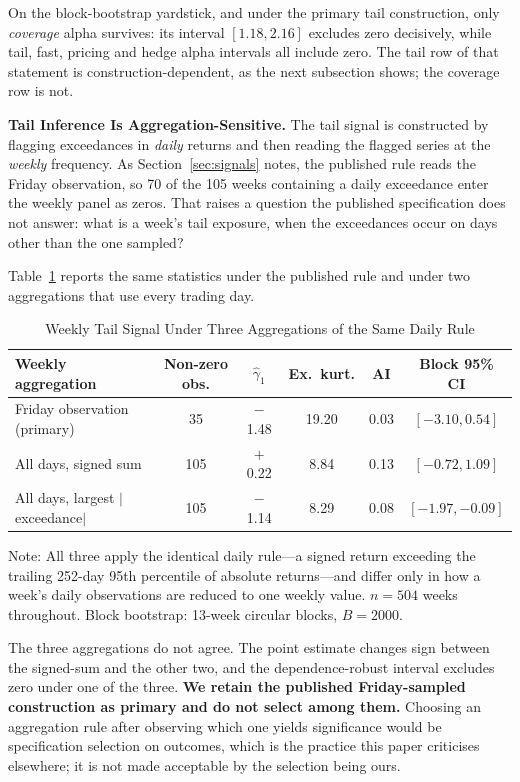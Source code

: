 \documentclass[11pt]{article}
\begin{document}
On the block-bootstrap yardstick, and under the primary tail construction, only \emph{coverage} alpha survives: its interval $[1.18, 2.16]$ excludes zero decisively, while tail, fast, pricing and hedge alpha intervals all include zero. The tail row of that statement is construction-dependent, as the next subsection shows; the coverage row is not.

\textbf{Tail Inference Is Aggregation-Sensitive.} The tail signal is constructed by flagging exceedances in \emph{daily} returns and then reading the flagged series at the \emph{weekly} frequency. As Section~\ref{sec:signals} notes, the published rule reads the Friday observation, so 70 of the 105 weeks containing a daily exceedance enter the weekly panel as zeros. That raises a question the published specification does not answer: what is a week's tail exposure, when the exceedances occur on days other than the one sampled?

Table~\ref{tab:tailagg} reports the same statistics under the published rule and under two aggregations that use every trading day.

\begin{table}[H]
\centering
\caption{Weekly Tail Signal Under Three Aggregations of the Same Daily Rule}
\label{tab:tailagg}
\small
\begin{tabular}{@{}lccccc@{}}
\toprule
Weekly aggregation & Non-zero obs. & $\hat{\gamma}_1$ & Ex.\ kurt. & AI & Block 95\% CI \\
\midrule
Friday observation (primary) & 35 & $-$1.48 & 19.20 & 0.03 & $[-3.10, 0.54]$ \\
All days, signed sum & 105 & $+$0.22 & 8.84 & 0.13 & $[-0.72, 1.09]$ \\
All days, largest $|$exceedance$|$ & 105 & $-$1.14 & 8.29 & 0.08 & $[-1.97, -0.09]$ \\
\bottomrule
\end{tabular}
\par\vspace{0.3em}
\parbox{\linewidth}{\footnotesize Note: All three apply the identical daily rule---a signed return exceeding the trailing 252-day 95th percentile of absolute returns---and differ only in how a week's daily observations are reduced to one weekly value. $n = 504$ weeks throughout. Block bootstrap: 13-week circular blocks, $B = 2000$.}
\end{table}

The three aggregations do not agree. The point estimate changes sign between the signed-sum and the other two, and the dependence-robust interval excludes zero under one of the three. \textbf{We retain the published Friday-sampled construction as primary and do not select among them.} Choosing an aggregation rule after observing which one yields significance would be specification selection on outcomes, which is the practice this paper criticises elsewhere; it is not made acceptable by the selection being ours.
\end{document}
